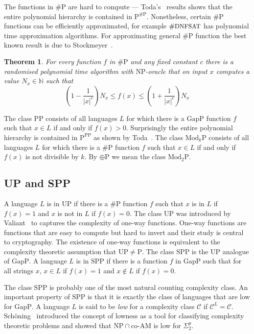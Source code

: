 \documentclass[11pt]{madras}%
\newtheorem{theorem}{Theorem}[chapter]
\theoremstyle{remark}
\newcommand{\ModkP}[1]{{\ensuremath{\mathrm{Mod}_{#1}\mathrm{P}}}}
\newcommand{\length}[1]{{\ensuremath{\left|#1\right|}}}
\newcommand{\ProblemFont}[1]{{\ensuremath{\textrm{\small #1}}}}
\begin{document}
The functions in $\# \mathrm{P}$ are hard to compute ---
Toda's~\cite{toda91pp} results shows that the entire polynomial
hierarchy is contained in $\mathrm{P}^{\# \mathrm{P}}$. Nonetheless,
certain $\# \mathrm{P}$ functions can be efficiently approximated, for
example $\# \ProblemFont{DNFSAT}$ has polynomial time approximation
algorithms. For approximating general $\# \mathrm{P}$ function the
best known result is due to
Stockmeyer~\cite{stockmeyer85approximating}.


\begin{theorem}
  For every function $f$ in $\# \mathrm{P}$ and any fixed constant $c$
  there is a randomised polynomial time algorithm with
  $\mathrm{NP}$-oracle that on input $x$ computes a value $N_x \in
  \mathbb{N}$ such that
  \[
  \left( 1 - \frac{1}{\length{x}^c}\right) N_x \leq f(x) \leq \left( 1
    + \frac{1}{\length{x}^c}\right) N_x
  \]
\end{theorem}

The class $\mathrm{PP}$ consists of all languages $L$ for which there
is a $\mathrm{GapP}$ function $f$ such that $x \in L$ if and only if
$f(x) > 0$. Surprisingly the entire polynomial hierarchy is contained
in $\mathrm{P}^{\mathrm{PP}}$ as shown by Toda~\cite{toda91pp}.  The
class $\ModkP{k}$ consists of all languages $L$ for which there is a
$\# \mathrm{P}$ function $f$ such that $x \in L$ if and only if $f(x)$
is not divisible by $k$. By $\oplus \mathrm{P}$ we mean the class
$\ModkP{2}$.

\subsection*{UP and SPP}

A language $L$ is in $\mathrm{UP}$ if there is a $\# \mathrm{P}$
function $f$ such that $x$ is in $L$ if $f(x) = 1$ and $x$ is not in
$L$ if $f(x) = 0$. The class $\mathrm{UP}$ was introduced by
Valiant~\cite{valiant76relative} to captures the complexity of one-way
functions. One-way functions are functions that are easy to compute
but hard to invert and their study is central to cryptography. The
existence of one-way functions is equivalent to the complexity
theoretic assumption that $\mathrm{UP} \neq \mathrm{P}$. The class
$\mathrm{SPP}$ is the $\mathrm{UP}$ analogue of $\mathrm{GapP}$. A
language $L$ is in $\mathrm{SPP}$ if there is a function $f$ in
$\mathrm{GapP}$ such that for all strings $x$, $x \in L$ if $f(x) = 1$
and $x \not \in L$ if $f(x) = 0$.

The class $\mathrm{SPP}$ is probably one of the most natural counting
complexity class. An important property of $\mathrm{SPP}$ is that it
is exactly the class of languages that are low for $\mathrm{GapP}$. A
language $L$ is said to be \emph{low} for a complexity class
$\mathcal{C}$ if $\mathcal{C}^L = \mathcal{C}$.  Sch\"oning~\cite{schoning88graph} introduced the concept of
lowness as a tool for classifying complexity theoretic problems and
showed that $\mathrm{NP}\cap \textrm{co-}\mathrm{AM}$ is low for
$\Sigma_2^p$. 
\end{document}
